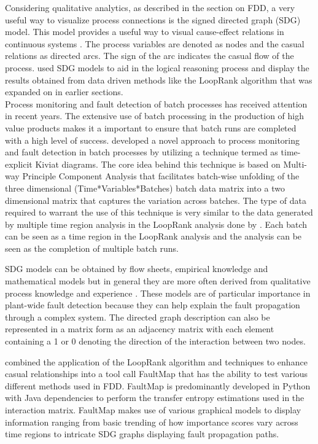 Considering qualitative analytics, as described in the section on FDD, a very useful way to visualize process connections is the signed directed graph (SDG) model. This model provides a useful way to visual cause-effect relations in continuous systems \cite{yang2010qualitative}. The process variables are denoted as nodes and the casual relations as directed arcs. The sign of the arc indicates the casual flow of the process. \cite{streicher2019plant} used SDG models to aid in the logical reasoning process and display the results obtained from data driven methods like the LoopRank algorithm that was expanded on in earlier sections.\\

Process monitoring and fault detection of batch processes has received attention in recent years. The extensive use of batch processing in the production of high value products makes it a important to ensure that batch runs are completed with a high level of success. \cite{wang2018geometric} developed a novel approach to process monitoring and fault detection in batch processes by utilizing a technique termed as time-explicit Kiviat diagrams. The core idea behind this technique is based on Multi-way Principle Component Analysis that facilitates batch-wise unfolding of the three dimensional (Time*Variables*Batches) batch data matrix into a two dimensional matrix that captures the variation across batches. The type of data required to warrant the use of this technique is very similar to the data generated by multiple time region analysis in the LoopRank analysis done by \cite{streicher2019plant}. Each batch can be seen as a time region in the LoopRank analysis and the analysis can be seen as the completion of multiple batch runs.

SDG models can be obtained by flow sheets, empirical knowledge and mathematical models but in general they are more often derived from qualitative process knowledge and experience \cite{yang2010qualitative}. These models are of particular importance in plant-wide fault detection because they can help explain the fault propagation through a complex system. The directed graph description can also be represented in a matrix form as an adjacency matrix with each element containing a 1 or 0 denoting the direction of the interaction between two nodes.

\cite{streicher2019plant} combined the application of the LoopRank algorithm and techniques to enhance casual relationships into a tool call FaultMap that has the ability to test various different methods used in FDD. FaultMap is predominantly developed in Python with Java dependencies to perform the transfer entropy estimations used in the interaction matrix. FaultMap makes use of various graphical models to display information ranging from basic trending of how importance scores vary across time regions to intricate SDG graphs displaying fault propagation paths.




